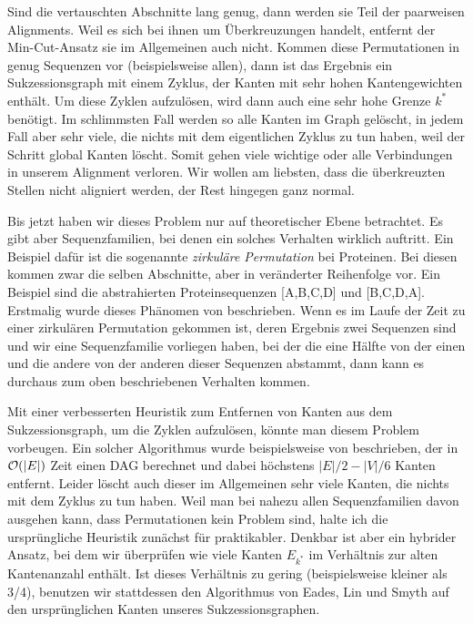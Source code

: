 Sind die vertauschten Abschnitte lang genug, dann werden sie Teil der paarweisen Alignments. Weil es sich bei ihnen um Überkreuzungen handelt, entfernt der Min-Cut-Ansatz sie im Allgemeinen auch nicht. Kommen diese Permutationen in genug Sequenzen vor (beispielsweise allen), dann ist das Ergebnis ein Sukzessionsgraph mit einem Zyklus, der Kanten mit sehr hohen Kantengewichten enthält. Um diese Zyklen aufzulösen, wird dann auch eine sehr hohe Grenze $k^{*}$ benötigt. Im schlimmsten Fall werden so alle Kanten im Graph gelöscht, in jedem Fall aber sehr viele, die nichts mit dem eigentlichen Zyklus zu tun haben, weil der Schritt global Kanten löscht. Somit gehen viele wichtige oder alle Verbindungen in unserem Alignment verloren. Wir wollen am liebsten, dass die überkreuzten Stellen nicht aligniert werden, der Rest hingegen ganz normal.

Bis jetzt haben wir dieses Problem nur auf theoretischer Ebene betrachtet. Es gibt aber Sequenzfamilien, bei denen ein solches Verhalten wirklich auftritt. Ein Beispiel dafür ist die sogenannte \emph{zirkuläre Permutation} bei Proteinen. Bei diesen kommen zwar die selben Abschnitte, aber in veränderter Reihenfolge vor. Ein Beispiel sind die abstrahierten Proteinsequenzen [A,B,C,D] und [B,C,D,A]. Erstmalig wurde dieses Phänomen von \cite{chhe79} beschrieben. Wenn es im Laufe der Zeit zu einer zirkulären Permutation gekommen ist, deren Ergebnis zwei Sequenzen sind und wir eine Sequenzfamilie vorliegen haben, bei der die eine Hälfte von der einen und die andere von der anderen dieser Sequenzen abstammt, dann kann es durchaus zum oben beschriebenen Verhalten kommen.

Mit einer verbesserten Heuristik zum Entfernen von Kanten aus dem Sukzessionsgraph, um die Zyklen aufzulösen, könnte man diesem Problem vorbeugen. Ein solcher Algorithmus wurde beispielsweise von \cite{els93} beschrieben, der in $\mathcal{O}(|E|)$ Zeit einen DAG berechnet und dabei höchstens $|E|/2 - |V|/6$ Kanten entfernt. Leider löscht auch dieser im Allgemeinen sehr viele Kanten, die nichts mit dem Zyklus zu tun haben. Weil man bei nahezu allen Sequenzfamilien davon ausgehen kann, dass Permutationen kein Problem sind, halte ich die ursprüngliche Heuristik zunächst für praktikabler. Denkbar ist aber ein hybrider Ansatz, bei dem wir überprüfen wie viele Kanten $E_{k^{*}}$ im Verhältnis zur alten Kantenanzahl enthält. Ist dieses Verhältnis zu gering (beispielsweise kleiner als 3/4), benutzen wir stattdessen den Algorithmus von Eades, Lin und Smyth auf den ursprünglichen Kanten unseres Sukzessionsgraphen.

